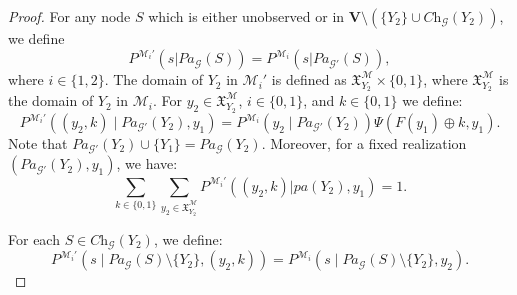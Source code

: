 \documentclass[accepted]{uai2022}
\newcommand{\Pa}[2]{\textit{Pa}_{#2}(#1)}
\newcommand{\Ch}[2]{\textit{Ch}_{#2}(#1)}
\newcommand{\V}[0]{\mathbf{V}}
\newcommand{\G}[0]{\mathcal{G}}
\newcommand{\M}[0]{\mathcal{M}}
\newcommand{\dom}[1]{\mathfrak{X}_{#1}}
\begin{document}
\begin{proof}
            For any node $S$ which is either unobserved or in $\V \setminus (\{Y_2\}\cup \Ch{Y_2}{\G})$, we define
            \begin{equation*}
                P^{\M_i'}(s|\Pa{S}{\G}) = P^{\M_i}(s|\Pa{S}{\G'}),
            \end{equation*}
            where $i \in \{1, 2\}$.
            The domain of $Y_2$ in $\M_i'$ is defined as $\dom{Y_2}^{\M}\times \{0, 1\}$, where $\dom{Y_2}^{\M}$ is the domain of $Y_2$ in $\M_i$. 
            For $y_2 \in \dom{Y_2}^\M$, $i\in \{0,1\}$, and $k\in \{0, 1\}$ we define:
            \begin{equation*}
                P^{\M_i'}((y_2, k) 
                \mid \Pa{Y_2}{\G'}, y_1) =
                P^{\M_i}(y_2 \mid \Pa{Y_2}{\G'}) \Psi(F(y_1)\oplus k, y_1).
            \end{equation*}
            Note that $\Pa{Y_2}{\G'}\cup \{Y_1\}= \Pa{Y_2}{\G}$.
            Moreover, for a fixed realization $(\Pa{Y_2}{\G'}, y_1)$, we have:
            \begin{equation*}
                \sum_{k\in \{0,1\}} \sum_{y_2\in \dom{Y_2}^{\M}} P^{\M_i'}((y_2, k)|pa(Y_2), y_1) = 1.
            \end{equation*}
            
            For each $S \in \Ch{Y_2}{\G}$, we define:
            \begin{equation*}
                P^{\M_i'}(s \mid \Pa{S}{\G}\setminus \{Y_2\}, (y_2, k)) =
                P^{\M_i}(s \mid \Pa{S}{\G}\setminus \{Y_2\}, y_2).
            \end{equation*}
            

\end{proof}
\end{document}
